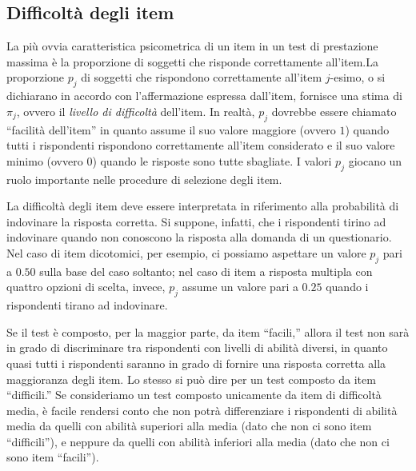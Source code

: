 \subsection{Difficoltà degli item}

La più ovvia caratteristica psicometrica di un item in un test di prestazione massima è la proporzione di soggetti che risponde correttamente all'item.La proporzione $p_j$ di soggetti che rispondono correttamente all'item $j$-esimo, o si
    dichiarano in accordo con  l'affermazione espressa dall'item,
    fornisce una stima di $\pi_j$, ovvero il \emph{livello di
      difficoltà} dell'item.  In realtà, $p_j$  dovrebbe essere chiamato ``facilità
      dell'item'' in quanto assume il suo valore maggiore (ovvero $1$)
    quando tutti i rispondenti rispondono correttamente all'item
    considerato e il suo valore minimo (ovvero $0$) quando le risposte
    sono tutte sbagliate.  I valori $p_j$ giocano un ruolo importante nelle procedure di
    selezione degli item. 

La difficoltà degli item deve essere interpretata in
    riferimento alla probabilità di indovinare la risposta
    corretta. Si suppone, infatti, che i rispondenti tirino ad
    indovinare quando non conoscono la risposta alla domanda di un
    questionario.  Nel caso di item dicotomici, per esempio, ci
    possiamo aspettare un  valore $p_j$ pari a $0.50$ sulla base del
    caso soltanto; nel caso di item a risposta multipla con quattro
    opzioni di scelta, invece, $p_j$ assume un valore pari a $0.25$
    quando i rispondenti tirano ad indovinare.  

Se il test è composto, per la maggior
    parte, da item ``facili,'' allora il test non sarà in grado di
    discriminare tra rispondenti con livelli di abilità diversi, in
    quanto quasi tutti i rispondenti saranno in grado di fornire una
    risposta corretta alla maggioranza degli item.  Lo stesso si può
    dire per un test composto da item ``difficili.''  
Se consideriamo
    un test composto unicamente da item di difficoltà media, è facile
    rendersi conto che non potrà differenziare i rispondenti di
    abilità media 
 da quelli con abilità superiori alla media (dato che
    non ci sono item ``difficili''), 
    e neppure da quelli con abilità
    inferiori alla media (dato che non ci sono item ``facili''). 
    
